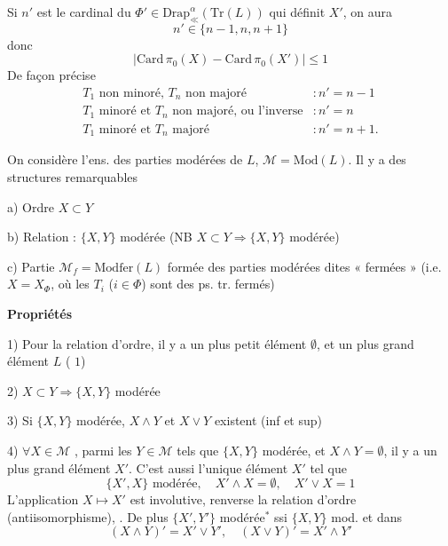 \documentclass[11pt,a4paper]{article}
\begin{document}

Si $n'$ est le cardinal du $\Phi' \in \mathrm{Drap}^{\alpha}_{\ll}(\mathrm{Tr}(L))$ qui définit $X'$, on aura
\[
  n' \in \{ n-1, n, n+1 \}
\]
donc
\[
  \bigl| \mathrm{Card}\, \pi_0(X) - \mathrm{Card}\, \pi_0(X') \bigr| \leq 1
\]
De façon précise
\[
  \begin{array}{ll}
    T_1 \text{ non minoré, } T_n \text{ non majoré} & : n' = n-1 \\
    T_1 \text{ minoré et } T_n \text{ non majoré, ou l'inverse} & : n' = n \\
    T_1 \text{ minoré et } T_n \text{ majoré} & : n' = n+1 .
  \end{array}
\]
\struck{(\ill{})}

On considère l'ens.  des parties modérées de $L$, $\mathcal{M} = \mathrm{Mod}(L)$. Il y a des structures remarquables

a) Ordre $X \subset Y$

b) Relation : $\{X,Y\}$ modérée \quad (NB $X \subset Y \Rightarrow \{X,Y\}$ modérée)

c) Partie $\mathcal{M}_f = \mathrm{Modfer}(L)$ formée des parties modérées dites « fermées » (i.e. $X = X_{\Phi}$, où les $T_i$ ($i \in \Phi$) sont des ps. tr. fermés)

\textbf{Propriétés}

1) Pour la relation d'ordre, il y a un plus petit élément $\emptyset$, et un plus grand élément $L$ ( $1$)

2) $X \subset Y \Longrightarrow \{X,Y\}$ modérée

3) Si $\{X,Y\}$ modérée, $X \wedge Y$ et $X \vee Y$ existent (inf et sup)


4)  $\forall X \in \mathcal{M}$ \struck{\ill{}}, parmi les $Y \in \mathcal{M}$ tels que $\{X,Y\}$ modérée, et $X \wedge Y = \emptyset$, il y a un plus grand élément $X'$. C'est aussi l'unique élément $X'$ tel que
\[
  \{X', X\} \text{ modérée}, \quad X' \wedge X = \emptyset, \quad X' \vee X = 1
\]
L'application $X \longmapsto X'$ est involutive, renverse la relation d'ordre (antiisomorphisme), \struck{\ill{}}. De plus $\{X', Y'\}$ modérée${}^{*}$ ssi $\{X,Y\}$ mod. et dans 
\[
  (X \wedge Y)' = X' \vee Y', \quad (X \vee Y)' = X' \wedge Y'
\]
\end{document}
